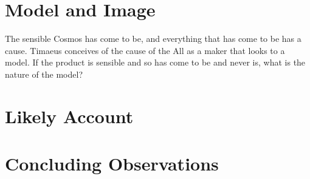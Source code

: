 
\section{Model and Image} %
\label{sec:model_and_image}

The sensible Cosmos has come to be, and everything that has come to be has a cause. Timaeus conceives of the cause of the All as a maker that looks to a model. If the product is sensible and so has come to be and never is, what is the nature of the model?


\section{Likely Account} %
\label{sec:likely_account}




\section{Concluding Observations} %
\label{sec:concluding_observations}




